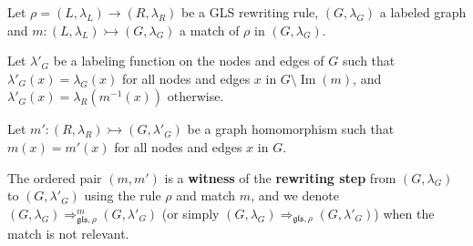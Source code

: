 \begin{definition}
  \label{def:gls_witness_rewriting_step}
  Let \( \rho \mathop{=} (L, \lambda_L) \mathop{\to} (R,\lambda_R) \) be a GLS rewriting rule, \( (G, \lambda_G) \) a labeled graph and \( m : (L, \lambda_L) \rightarrowtail (G,\lambda_G) \) a match of \( \rho \) in \( (G, \lambda_G) \).
  
  Let $\lambda'_G$ be a labeling function on the nodes and edges of \( G \) such that \( \lambda'_G(x) \mathop{=} \lambda_G(x) \) for all nodes and edges \( x \) in \( G \mathop{\setminus} \operatorname{Im}(m) \), and \( \lambda'_G(x) \mathop{=} \lambda_R(m^{-1}(x)) \) otherwise.

  Let $m' : (R, \lambda_R) \rightarrowtail (G, \lambda'_G)$ be a graph homomorphism such that \( m(x) \mathop{=} m'(x) \) for all nodes and edges \( x \) in \( G \).

  The ordered pair $(m, m')$ is a \textbf{witness} of the \textbf{rewriting step} from \( (G, \lambda_G) \) to \( (G, \lambda'_G) \) using the rule \( \rho \) and match \( m \), and we denote $(G,\lambda_G) \mathop{\Rightarrow}_{\mathfrak{gls},\rho}^m (G,\lambda'_G)$ (or simply \( (G,\lambda_G) \mathop{\Rightarrow}_{\mathfrak{gls},\rho} (G,\lambda'_G) \)) when the match is not relevant.
\end{definition}




